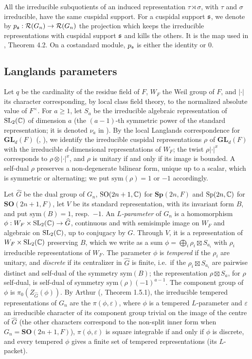 \documentclass[a4paper,12pt,leqno]{amsart}
\theoremstyle{plain}
\theoremstyle{definition}
\begin{document}
All the irreducible subquotients of an induced representation $\tau\rtimes\sigma$, with $\tau$ and
$\sigma$ irreducible, have the same cuspidal support. For a cuspidal support $\mathfrak{s}$, we denote by
$p_{\mathfrak{s}}:\mathcal{R}(G_n)\rightarrow\mathcal{R}(G_n)$ the projection which keeps the irreducible representations
with cuspidal support $\mathfrak{s}$ and kills the others. It is the map used in \cite{Ato24}, Theorem 4.2.
On a costandard module, $p_{\mathfrak{s}}$ is either the identity or $0$.

\subsection{Langlands parameters}\label{ssec:types}
Let $q$ be the cardinality of the residue field of $F$, $W_F$ the Weil group of $F$, and $|\cdot|$ its character corresponding, by local class field
theory, to the normalized absolute value of $F^\times$. For $a\geq1$, let $S_a$ be the irreducible
algebraic representation of $\mathrm{SL}_2(\mathbb{C})$ of dimension $a$ (the $(a-1)$-th symmetric power of the
standard representation; it is denoted $\nu_a$ in \cite{Art13}). By the local Langlands correspondence for $\mathbf{GL}_d(F)$ (\cite{HT01},
\cite{Hen00}), we identify the irreducible cuspidal representations $\rho$ of $\mathbf{GL}_d(F)$ with the
irreducible $d$-dimensional representations of $W_F$; the twist $\rho|\cdot|^x$ corresponds to
$\rho\otimes|\cdot|^x$, and $\rho$ is unitary if and only if its image is bounded. A self-dual $\rho$
preserves a non-degenerate bilinear form, unique up to a scalar, which is symmetric or alternating; we
put $\mathrm{sym}(\rho)=1$ or $-1$ accordingly.

Let $\widehat G$ be the dual group of $G_n$, $\mathrm{SO}(2n+1,\mathbb{C})$ for $\mathbf{Sp}(2n,F)$ and
$\mathrm{Sp}(2n,\mathbb{C})$ for $\mathbf{SO}(2n+1,F)$, let $V$ be its standard representation, with its
invariant form $B$, and put $\mathrm{sym}(B)=1$, resp.\ $-1$. An \emph{$L$-parameter} of $G_n$ is a
homomorphism $\phi:W_F\times\mathrm{SL}_2(\mathbb{C})\to\widehat G$, continuous and with semisimple image on
$W_F$ and algebraic on $\mathrm{SL}_2(\mathbb{C})$, up to conjugacy by $\widehat G$. Through $V$, it is a
representation of $W_F\times\mathrm{SL}_2(\mathbb{C})$ preserving $B$, which we write as a sum
$\phi=\bigoplus_i\rho_i\boxtimes S_{a_i}$ with $\rho_i$ irreducible representations of $W_F$. The
parameter $\phi$ is \emph{tempered} if the $\rho_i$ are unitary, and \emph{discrete} if its centralizer
in $\widehat G$ is finite, i.e.\ if the $\rho_i\boxtimes S_{a_i}$ are pairwise distinct and self-dual of
the symmetry $\mathrm{sym}(B)$; the representation $\rho\boxtimes S_a$, for $\rho$ self-dual, is self-dual
of symmetry $\mathrm{sym}(\rho)(-1)^{a-1}$. The component group of $\phi$ is
$\pi_0(Z_{\widehat G}(\phi))$. By Arthur (\cite{Art13}, Theorem 1.5.1), the irreducible tempered representations of $G_n$
are the $\pi(\phi,\varepsilon)$, where $\phi$ is a tempered $L$-parameter and $\varepsilon$ an irreducible
character of its component group trivial on the image of the centre of $\widehat G$ (the other characters
correspond to the non-split inner form when $G_n=\mathbf{SO}(2n+1,F)$), $\pi(\phi,\varepsilon)$ is square integrable if and only if $\phi$ is
discrete, and every tempered $\phi$ gives a finite set of tempered representations (its $L$-packet).
\end{document}
